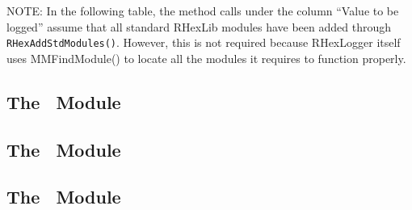 NOTE: In the following table, the method calls under the column ``Value to
be logged'' assume that all standard RHexLib modules have been added through
{\tt RHexAddStdModules()}. However, this is not required because RHexLogger
itself uses MMFindModule() to locate all the modules it requires to function
properly. 



\subsection{The \VirtualMotor\ Module}
\subsection{The \VirtualInput\ Module}
\subsection{The \PulseWidth\ Module}

\begin{figure}[!ht]
  \centering
  \begin{sideways}
    \label{fig:module_summary}
  \end{sideways}
\end{figure}
\clearpage


